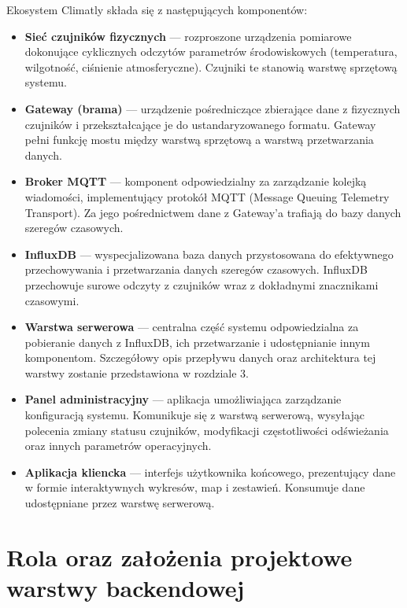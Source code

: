 \documentclass[a4paper,12pt,openany]{book}
\begin{document}
Ekosystem Climatly składa się z następujących komponentów:

\begin{itemize}
  \item \textbf{Sieć czujników fizycznych} --- rozproszone urządzenia pomiarowe dokonujące cyklicznych odczytów parametrów środowiskowych (temperatura, wilgotność, ciśnienie atmosferyczne). Czujniki te stanowią warstwę sprzętową systemu.

  \item \textbf{Gateway (brama)} --- urządzenie pośredniczące zbierające dane z fizycznych czujników i przekształcające je do ustandaryzowanego formatu. Gateway pełni funkcję mostu między warstwą sprzętową a warstwą przetwarzania danych.

  \item \textbf{Broker MQTT} --- komponent odpowiedzialny za zarządzanie kolejką wiadomości, implementujący protokół MQTT (Message Queuing Telemetry Transport). Za jego pośrednictwem dane z Gateway'a trafiają do bazy danych szeregów czasowych.

  \item \textbf{InfluxDB} --- wyspecjalizowana baza danych przystosowana do efektywnego przechowywania i przetwarzania danych szeregów czasowych. InfluxDB przechowuje surowe odczyty z czujników wraz z dokładnymi znacznikami czasowymi.

  \item \textbf{Warstwa serwerowa} --- centralna część systemu odpowiedzialna za pobieranie danych z InfluxDB, ich przetwarzanie i udostępnianie innym komponentom. Szczegółowy opis przepływu danych oraz architektura tej warstwy zostanie przedstawiona w rozdziale 3.

  \item \textbf{Panel administracyjny} --- aplikacja umożliwiająca zarządzanie konfiguracją systemu. Komunikuje się z warstwą serwerową, wysyłając polecenia zmiany statusu czujników, modyfikacji częstotliwości odświeżania oraz innych parametrów operacyjnych.

  \item \textbf{Aplikacja kliencka} --- interfejs użytkownika końcowego, prezentujący dane w formie interaktywnych wykresów, map i zestawień. Konsumuje dane udostępniane przez warstwę serwerową.
\end{itemize}

\section{Rola oraz założenia projektowe warstwy backendowej}
\end{document}
